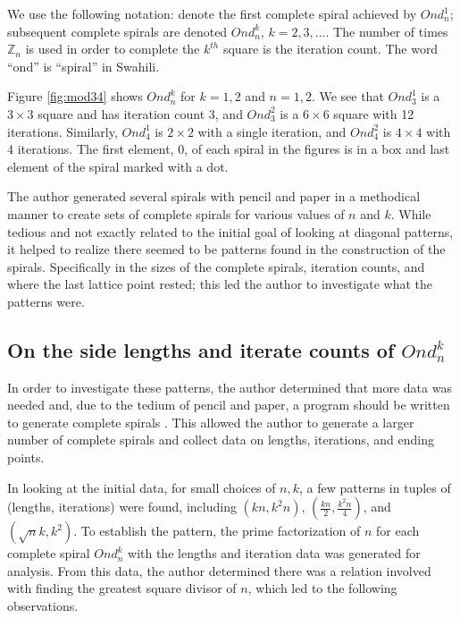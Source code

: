 \documentclass[11pt,reqno]{amsart}
\theoremstyle{mydef}
\def\ZZ{\mathbb{Z}}
\begin{document}
We use the following notation: denote the first complete spiral
achieved by $Ond^1_n$; subsequent complete spirals are denoted
$Ond^k_n$, $k = 2,3,\dots$.  The number of times $\ZZ_n$ is used in
order to complete the $k^{th}$ square is the iteration count.  The
word ``ond'' is ``spiral'' in Swahili.


Figure \ref{fig:mod34} shows $Ond_n^k$ for $k=1,2$ and $n=1,2$.  We
see that $Ond^1_3$ is a $3\times3$ square and has iteration count 3,
and $Ond^2_3$ is a $6\times6$ square with 12 iterations.  Similarly,
$Ond^1_4$ is $2\times2$ with a single iteration, and $Ond^2_4$ is
$4\times4$ with 4 iterations. The first element, 0, of each spiral in the
figures is in a box and last element of the spiral marked with a dot.

The author generated several spirals with pencil and paper in a
methodical manner to create sets of complete spirals for various
values of $n$ and $k$.  While tedious and not exactly related to the
initial goal of looking at diagonal patterns, it helped to realize
there seemed to be patterns found in the construction of the spirals.
Specifically in the sizes of the complete spirals, iteration counts,
and where the last lattice point rested; this led the author to
investigate what the patterns were.

\subsection{On the side lengths and iterate counts of $Ond^k_n$}

In order to investigate these patterns, the author determined that
more data was needed and, due to the tedium of pencil and paper, a
program should be written to generate complete spirals
\cite{PySquare}.  This allowed the author to generate a larger number
of complete spirals and collect data on lengths, iterations, and
ending points.

In looking at the initial data, for small choices of $n, k$, a few
patterns in tuples of (lengths, iterations) were found, including
$(kn, k^2 n)$, $(\frac{kn}{2}, \frac{k^2 n}{4})$, and $(\sqrt{n}k,
k^2)$.  To establish the pattern, the prime factorization of $n$ for
each complete spiral $Ond^k_n$ with the lengths and iteration data was
generated for analysis.  From this data, the author determined there
was a relation involved with finding the greatest square divisor of
$n$, which led to the following observations.
\end{document}
